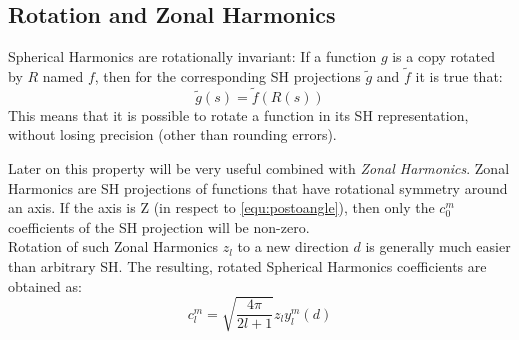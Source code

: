 \documentclass[thesis.tex]{subfiles}
\begin{document}
\subsection{Rotation and Zonal Harmonics} \label{sec:preq:zonalharmonics}
Spherical Harmonics are rotationally invariant:
If a function $g$ is a copy rotated by $R$ named $f$, then for the corresponding SH projections $\widetilde{g}$ and $\widetilde{f}$ it is true that:
\begin{equation}
	\widetilde{g}(s) = \widetilde{f}(R(s))
\end{equation}
This means that it is possible to rotate a function in its SH representation, without losing precision (other than rounding errors).

Later on this property will be very useful combined with \emph{Zonal Harmonics}.
Zonal Harmonics are SH projections of functions that have rotational symmetry around an axis.
If the axis is Z (in respect to \autoref{equ:postoangle}), then only the $c^m_0$ coefficients of the SH projection will be non-zero.\\
Rotation of such Zonal Harmonics $z_l$ to a new direction $d$ is generally much easier than arbitrary SH.
The resulting, rotated Spherical Harmonics coefficients are obtained as:
\begin{equation} \label{eq:zonalrotate}
	c_l^m = \sqrt{\frac{4\pi}{2l+1}} z_l y_l^m(d)
\end{equation}

\subfilebib %
\end{document}
